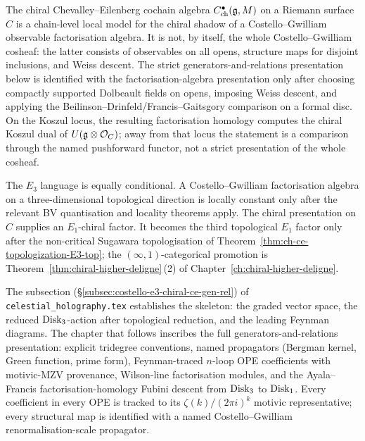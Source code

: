 The chiral Chevalley--Eilenberg cochain algebra
$C^\bullet_{\mathrm{ch}}(\mathfrak{g},M)$ on a Riemann surface $C$ is a
chain-level local model for the chiral shadow of a
Costello--Gwilliam observable factorisation algebra. It is not, by
itself, the whole Costello--Gwilliam cosheaf: the latter consists of
observables on all opens, structure maps for disjoint inclusions, and
Weiss descent. The strict generators-and-relations presentation below
is identified with the factorisation-algebra presentation only after
choosing compactly supported Dolbeault fields on opens, imposing Weiss
descent, and applying the Beilinson--Drinfeld/Francis--Gaitsgory
comparison on a formal disc. On the Koszul locus, the resulting
factorisation homology computes the chiral Koszul dual of
$U(\mathfrak{g}\otimes\mathcal{O}_C)$; away from that locus the statement is a
comparison through the named pushforward functor, not a strict
presentation of the whole cosheaf.

The $E_3$ language is equally conditional. A Costello--Gwilliam
factorisation algebra on a three-dimensional topological direction is
locally constant only after the relevant BV quantisation and locality
theorems apply. The chiral presentation on $C$ supplies an
$E_1$-chiral factor. It becomes the third topological $E_1$ factor only
after the non-critical Sugawara topologisation of
Theorem~\ref{thm:ch-ce-topologization-E3-top}; the
$(\infty,1)$-categorical promotion is
Theorem~\ref{thm:chiral-higher-deligne}\,(2) of
Chapter~\ref{ch:chiral-higher-deligne}.

The subsection
(\S\ref{subsec:costello-e3-chiral-ce-gen-rel}) of
\texttt{celestial\_holography.tex} establishes the skeleton: the
graded vector space, the reduced $\mathrm{Disk}_3$-action after topological
reduction, and the leading Feynman diagrams. The chapter that follows
inscribes the full generators-and-relations presentation: explicit tridegree conventions,
named propagators (Bergman kernel, Green function, prime form),
Feynman-traced $n$-loop OPE coefficients with motivic-MZV provenance,
Wilson-line factorisation modules, and the Ayala--Francis
factorisation-homology Fubini descent from $\mathrm{Disk}_3$ to
$\mathrm{Disk}_1$. Every coefficient in every OPE is tracked to its
$\zeta(k)/(2\pi i)^k$ motivic representative; every structural map is
identified with a named Costello--Gwilliam renormalisation-scale
propagator.


